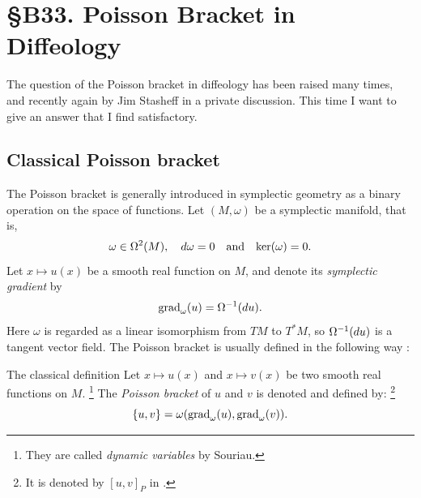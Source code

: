 
\chapter*{\S B33. Poisson Bracket in Diffeology}
\setcounter{footnote}{0}


\begin{abstract}
  In this note we show how to understand the Poisson bracket in diffeology,
  working directly on the group of Hamiltonian diffeomorphisms without involving tangent spaces and Hamiltonian gradients.
  Indeed,
  as it is usually defined,
  the Poisson bracket seems to be a contravariant object and therefore not really adapted to diffeology,
  but it can be defined in a covariant way, which is more adequate to the diffeology framework.
\end{abstract}


The question of the Poisson bracket in diffeology has been raised many times,
and recently again by Jim Stasheff in a private discussion.
This time I want to give an answer that I find satisfactory.

\section{Classical Poisson bracket}

The Poisson bracket is generally introduced in symplectic geometry as a binary operation on the space of functions.
Let $(M,\omega)$ be a symplectic manifold,
that is,
$$
  \omega \in \Omega^2(M), \quad d\omega = 0 \quad \text{and} \quad \mathrm{ker}(\omega) = 0.
$$
Let $x \mapsto u(x)$ be a smooth real function on $M$,
and denote its \emph{symplectic gradient} by
$$
  \operatorname{grad}_\omega(u) = \Omega^{-1}(du).
$$
Here $\omega$ is regarded as a linear isomorphism from $TM$ to $T^*M$,
so $\Omega^{-1}(du)$ is a tangent vector field.
The Poisson bracket is usually defined in the following way \cite{Sou70}:

\begin{Article}{The classical definition}{}
  Let $x \mapsto u(x)$ and $x \mapsto v(x)$ be two smooth real functions on $M$.%
  \footnote{They are called \emph{dynamic variables} by Souriau.}
  The \emph{Poisson bracket} of $u$ and $v$ is denoted and defined by:%
  \footnote{It is denoted by $[u,v]_P$ in \cite{Sou70}.}
  $$
    \{u,v\} = \omega(\operatorname{grad}_\omega(u), \operatorname{grad}_\omega(v)).
  $$
\end{Article}

